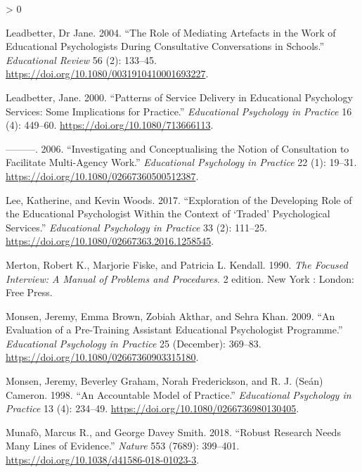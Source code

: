 \documentclass[
]{article}
\newlength{\cslhangindent}
\newenvironment{CSLReferences}[2] %
 {%
  \setlength{\parindent}{0pt}
  \ifodd #1 \everypar{\setlength{\hangindent}{\cslhangindent}}\ignorespaces\fi
  \ifnum #2 > 0
  \setlength{\parskip}{#2\baselineskip}
  \fi
 }%
 {}
\begin{document}
\begin{CSLReferences}{1}{0}
\leavevmode\hypertarget{ref-leadbetterRoleMediatingArtefacts2004}{}%
Leadbetter, Dr Jane. 2004. {``The Role of Mediating Artefacts in the
Work of Educational Psychologists During Consultative Conversations in
Schools.''} \emph{Educational Review} 56 (2): 133--45.
\url{https://doi.org/10.1080/0031910410001693227}.

\leavevmode\hypertarget{ref-leadbetterPatternsServiceDelivery2000}{}%
Leadbetter, Jane. 2000. {``Patterns of {Service Delivery} in
{Educational Psychology Services}: {Some} Implications for Practice.''}
\emph{Educational Psychology in Practice} 16 (4): 449--60.
\url{https://doi.org/10.1080/713666113}.

\leavevmode\hypertarget{ref-leadbetterInvestigatingConceptualisingNotion2006}{}%
---------. 2006. {``Investigating and {Conceptualising} the {Notion} of
{Consultation} to {Facilitate Multi}-Agency {Work}.''} \emph{Educational
Psychology in Practice} 22 (1): 19--31.
\url{https://doi.org/10.1080/02667360500512387}.

\leavevmode\hypertarget{ref-leeExplorationDevelopingRole2017}{}%
Lee, Katherine, and Kevin Woods. 2017. {``Exploration of the Developing
Role of the Educational Psychologist Within the Context of {`Traded'}
Psychological Services.''} \emph{Educational Psychology in Practice} 33
(2): 111--25. \url{https://doi.org/10.1080/02667363.2016.1258545}.

\leavevmode\hypertarget{ref-mertonFocusedInterviewManual1990}{}%
Merton, Robert K., Marjorie Fiske, and Patricia L. Kendall. 1990.
\emph{The {Focused Interview}: {A Manual} of {Problems} and
{Procedures}}. 2 edition. {New York : London}: {Free Press}.

\leavevmode\hypertarget{ref-monsenEvaluationPreTraining2009}{}%
Monsen, Jeremy, Emma Brown, Zobiah Akthar, and Sehra Khan. 2009. {``An
Evaluation of a Pre-Training Assistant Educational Psychologist
Programme.''} \emph{Educational Psychology in Practice} 25 (December):
369--83. \url{https://doi.org/10.1080/02667360903315180}.

\leavevmode\hypertarget{ref-monsenAccountableModelPractice1998}{}%
Monsen, Jeremy, Beverley Graham, Norah Frederickson, and R. J. (Seán)
Cameron. 1998. {``An Accountable Model of Practice.''} \emph{Educational
Psychology in Practice} 13 (4): 234--49.
\url{https://doi.org/10.1080/0266736980130405}.

\leavevmode\hypertarget{ref-munafoRobustResearchNeeds2018}{}%
Munafò, Marcus R., and George Davey Smith. 2018. {``Robust Research
Needs Many Lines of Evidence.''} \emph{Nature} 553 (7689): 399--401.
\url{https://doi.org/10.1038/d41586-018-01023-3}.


\end{CSLReferences}
\end{document}

